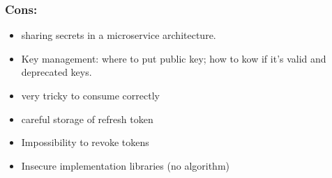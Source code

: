 \subsubsection{Cons:}
\begin{itemize}
    \item sharing secrets in a microservice architecture.
    \item Key management: where to put public key; how to kow if it's valid and
        deprecated keys.
    \item very tricky to consume correctly
    \item careful storage of refresh token
    \item Impossibility to revoke tokens
    \item Insecure implementation libraries (no algorithm)
\end{itemize}


